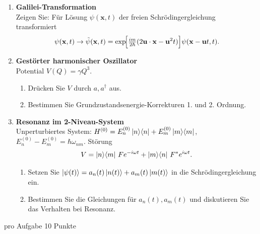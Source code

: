 \documentclass[11pt,a4paper]{article}
\begin{document}
\begin{enumerate}
\item \textbf{Galilei-Transformation}\\
Zeigen Sie: Für Lösung $\psi(\mathbf x,t)$ der freien Schrödingergleichung transformiert
\[
\psi(\mathbf x,t)\to \tilde\psi(\mathbf x,t)=\exp\!\Bigl[\tfrac{im}{2\hbar}(2\mathbf u\cdot\mathbf x-\mathbf u^2 t)\Bigr]\psi(\mathbf x-\mathbf u t,t).
\]

\item \textbf{Gestörter harmonischer Oszillator}\\
Potential $V(Q)=\gamma Q^3$.
\begin{enumerate}
  \item Drücken Sie $V$ durch $a,a^\dagger$ aus.
  \item Bestimmen Sie Grundzustandsenergie-Korrekturen 1. und 2. Ordnung.
\end{enumerate}

\item \textbf{Resonanz im 2-Niveau-System}\\
Unperturbiertes System: $H^{(0)}=E_n^{(0)}\ket{n}\!\bra{n}+E_m^{(0)}\ket{m}\!\bra{m}$, $E_n^{(0)}-E_m^{(0)}=\hbar\omega_{nm}$. Störung
\[
V=\ket{n}\!\bra{m}\,F e^{-i\omega t}+\ket{m}\!\bra{n}\,F^* e^{i\omega t}.
\]
\begin{enumerate}
  \item Setzen Sie $\ket{\psi(t)}=a_n(t)\ket{n(t)}+a_m(t)\ket{m(t)}$ in die Schrödingergleichung ein.
  \item Bestimmen Sie die Gleichungen für $a_n(t),a_m(t)$ und diskutieren Sie das Verhalten bei Resonanz.
\end{enumerate}

\end{enumerate}







\pagebreak


\noindent pro Aufgabe 10 Punkte
\end{document}

